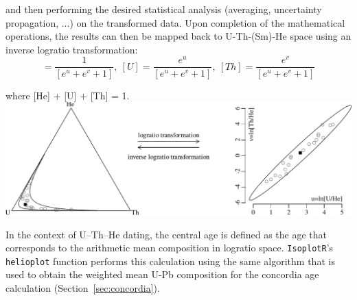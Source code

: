 \begin{refsection}
\noindent and then performing the desired statistical analysis
(averaging, uncertainty propagation, ...) on the transformed
data. Upon completion of the mathematical operations, the results can
then be mapped back to U-Th-(Sm)-He space using an inverse logratio
transformation:
\begin{equation}
    [He] = \frac{1}{\left[e^{u}+e^{v}+1\right]},~
    [U] = \frac{e^{u}}{\left[e^{u}+e^{v}+1\right]},~
    [Th] = \frac{e^{v}}{\left[e^{u}+e^{v}+1\right]}
    \label{eq:ialr}
\end{equation}

\noindent where [He] + [U] + [Th] = 1.\\

\noindent\includegraphics[width=\linewidth]{../figures/alr.pdf}
\begingroup
{}
\label{fig:alr}
\endgroup

In the context of U--Th--He dating, the central age is defined as the
age that corresponds to the arithmetic mean composition in logratio
space. \texttt{IsoplotR}'s \texttt{helioplot} function performs this
calculation using the same algorithm that is used to obtain the
weighted mean U-Pb composition for the concordia age calculation
(Section~\ref{sec:concordia}).\\


\end{refsection}
